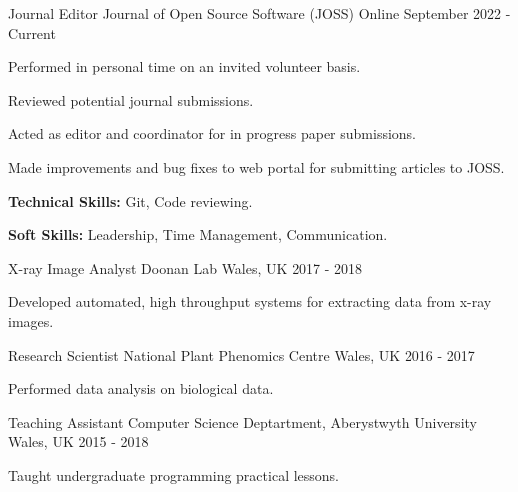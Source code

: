 \begin{cventries}
  \cventry
    {Journal Editor} %
    {Journal of Open Source Software (JOSS)} %
    {Online} %
    {September 2022 - Current} %
    {
      \begin{cvitems} %
        \item {Performed in personal time on an invited volunteer basis.}
        \item {Reviewed potential journal submissions.}
        \item {Acted as editor and coordinator for in progress paper submissions.}
        \item {Made improvements and bug fixes to web portal for submitting articles to JOSS.}
        \item {\textbf{Technical Skills:} Git, Code reviewing.}
        \item {\textbf{Soft Skills:} Leadership, Time Management, Communication.}
      \end{cvitems}
    }


  \cventry
    {X-ray Image Analyst} %
    {Doonan Lab} %
    {Wales, UK} %
    {2017 - 2018 } %
    {  \begin{cvitems} %
        \item {Developed automated, high throughput systems for extracting data from x-ray images.}
      \end{cvitems}
      }

  \cventry
    {Research Scientist} %
    {National Plant Phenomics Centre} %
    {Wales, UK} %
    {2016 - 2017 } %
        {  \begin{cvitems} %
        \item {Performed data analysis on biological data.}
      \end{cvitems}
      }

      \cventry
    {Teaching Assistant} %
    {Computer Science Deptartment, Aberystwyth University} %
    {Wales, UK} %
    {2015 - 2018} %
        {  \begin{cvitems} %
        \item {Taught undergraduate programming practical lessons.}
      \end{cvitems}
      }


\end{cventries}
